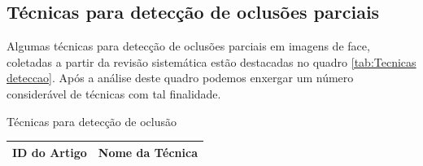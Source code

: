\subsection{Técnicas para detecção de oclusões parciais}
\label{sub:detecção de oclusões}
Algumas técnicas para detecção de oclusões parciais em imagens de face, coletadas a partir da revisão sistemática estão destacadas no quadro \ref{tab:Tecnicas deteccao}. Após a análise deste quadro podemos enxergar um número considerável de técnicas com tal finalidade.



\begin{quadro}[H]
	\centering
	\caption{Técnicas para detecção de oclusão}
		\begin{tabular}{p{1.2in} p{4.2in} } \hline

		ID do Artigo  & Nome da Técnica\\ \hline
  

\end{tabular}
\end{quadro}
